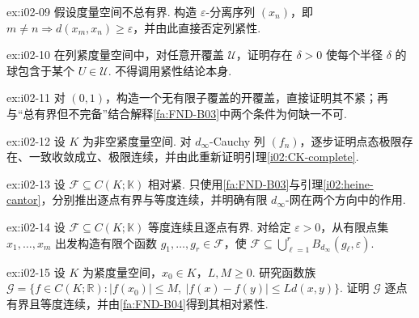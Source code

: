 \begin{FAExercise}[列紧推出总有界]{ex:i02-09}
假设度量空间不总有界. 构造 \(\displaystyle \varepsilon\)-分离序列 \(\displaystyle (x_n)\)，即 \(\displaystyle m\neq n\Rightarrow d(x_m,x_n)\geqslant\varepsilon\)，并由此直接否定列紧性.
\end{FAExercise}

\begin{FAExercise}{ex:i02-10}
在列紧度量空间中，对任意开覆盖 \(\displaystyle \mathcal U\)，证明存在 \(\displaystyle \delta>0\) 使每个半径 \(\displaystyle \delta\) 的球包含于某个 \(\displaystyle U\in\mathcal U\). 不得调用紧性结论本身.
\end{FAExercise}

\begin{FAExercise}[不完备性反例的直接开覆盖]{ex:i02-11}
对 \(\displaystyle (0,1)\)，构造一个无有限子覆盖的开覆盖，直接证明其不紧；再与“总有界但不完备”结合解释\autoref{fa:FND-B03}中两个条件为何缺一不可.
\end{FAExercise}

\begin{FAExercise}[上确界度量完备性]{ex:i02-12}
设 \(\displaystyle K\) 为非空紧度量空间. 对 \(\displaystyle d_\infty\)-Cauchy 列 \(\displaystyle (f_n)\)，逐步证明点态极限存在、一致收敛成立、极限连续，并由此重新证明引理\ref{i02:CK-complete}.
\end{FAExercise}

\begin{FAExercise}{ex:i02-13}
设 \(\displaystyle \mathcal F\subseteq C(K;\mathbb K)\) 相对紧. 只使用\autoref{fa:FND-B03}与引理\ref{i02:heine-cantor}，分别推出逐点有界与等度连续，并明确有限 \(\displaystyle d_\infty\)-网在两个方向中的作用.
\end{FAExercise}

\begin{FAExercise}{ex:i02-14}
设 \(\displaystyle \mathcal F\subseteq C(K;\mathbb K)\) 等度连续且逐点有界. 对给定 \(\displaystyle \varepsilon>0\)，从有限点集 \(\displaystyle x_1,\dots,x_m\) 出发构造有限个函数 \(\displaystyle g_1,\dots,g_r\in\mathcal F\)，使 \(\displaystyle \mathcal F\subseteq\bigcup_{\ell=1}^{r}B_{d_\infty}(g_\ell,\varepsilon)\).
\end{FAExercise}

\begin{FAExercise}[Lipschitz 族]{ex:i02-15}
设 \(\displaystyle K\) 为紧度量空间，\(\displaystyle x_0\in K\)，\(\displaystyle L,M\geqslant0\). 研究函数族 \(\displaystyle \mathcal G=\{f\in C(K;\mathbb R):|f(x_0)|\leqslant M,\ |f(x)-f(y)|\leqslant Ld(x,y)\}\).
证明 \(\displaystyle \mathcal G\) 逐点有界且等度连续，并由\autoref{fa:FND-B04}得到其相对紧性.
\end{FAExercise}

